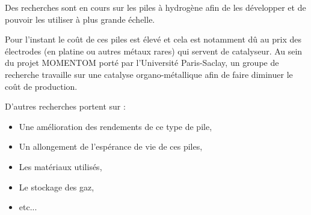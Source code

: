 \documentclass[a4paper, 11pt, twoside]{article}
\numberwithin{equation}{subsection}
\begin{document}
	Des recherches sont en cours sur les piles à hydrogène afin de les développer et de pouvoir les utiliser à plus grande échelle.
	
	Pour l'instant le coût de ces piles est élevé et cela est notamment dû au prix des électrodes (en platine ou autres métaux rares) qui servent de catalyseur. Au sein du projet MOMENTOM porté par l'Université Paris-Saclay, un groupe de recherche travaille sur une catalyse organo-métallique afin de faire diminuer le coût de production. 
	
	D'autres recherches portent sur :
	\begin{itemize}
		\item Une amélioration des rendements de ce type de pile,
		\item Un allongement de l'espérance de vie de ces piles,
		\item Les matériaux utilisés,
		\item Le stockage des gaz,
		\item etc... 
	\end{itemize}
	
	
	
\end{document}
